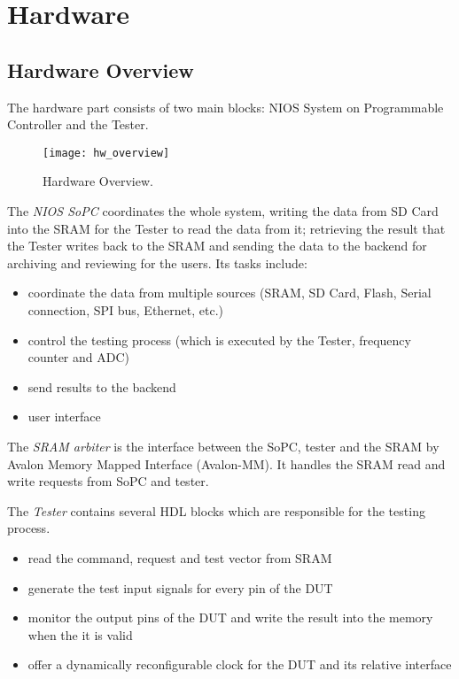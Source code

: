 \chapter{Hardware}

\section{Hardware Overview}

The hardware part consists of two main blocks: NIOS System on Programmable Controller and the Tester.

\begin{figure}
 \centering
 \texttt{[image: hw\_overview]}
 \caption{Hardware Overview.}
 \label{fig:hw_overview}
\end{figure}



The \textit{NIOS SoPC} coordinates the whole system, writing the data from SD Card into the SRAM for the Tester to read the data from it; retrieving the result that the Tester writes back to the SRAM and sending the data to the backend for archiving and reviewing for the users. Its tasks include:
\begin{itemize}
 \item coordinate the data from multiple sources (SRAM, SD Card, Flash, Serial connection, SPI bus, Ethernet, etc.)
 \item control the testing process (which is executed by the Tester, frequency counter and ADC)
 \item send results to the backend
 \item user interface
\end{itemize}

The \textit{SRAM arbiter} is the interface between the SoPC, tester and the SRAM by Avalon Memory Mapped Interface (Avalon-MM). It handles the SRAM read and write requests from SoPC and tester.

The \textit{Tester} contains several HDL blocks which are responsible for the testing process.
\begin{itemize}
 \item read the command, request and test vector from SRAM
 \item generate the test input signals for every pin of the DUT
 \item monitor the output pins of the DUT and write the result into the memory when the it is valid
 \item offer a dynamically reconfigurable clock for the DUT and its relative interface
\end{itemize}

